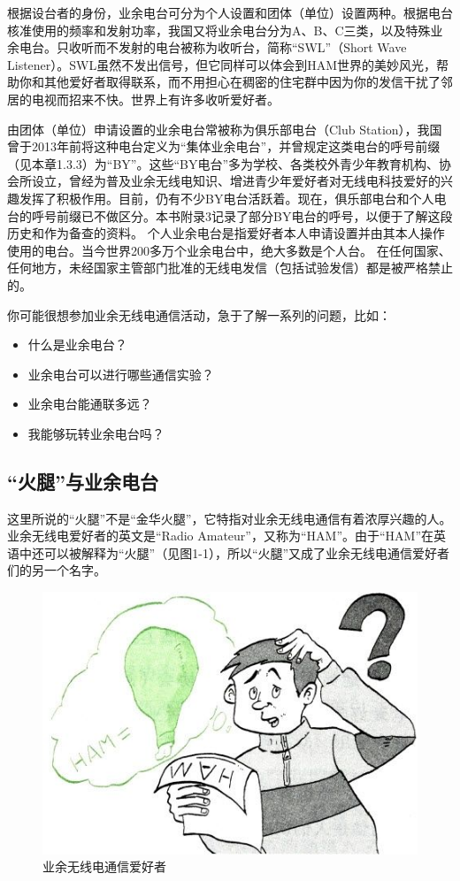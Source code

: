 \documentclass[12pt,UTF8]{ctexbook}
\begin{document}
根据设台者的身份，业余电台可分为个人设置和团体（单位）设置两种。根据电台核准使用的频率和发射功率，我国又将业余电台分为A、B、C三类，以及特殊业余电台。只收听而不发射的电台被称为收听台，简称“SWL”（Short Wave Listener）。SWL虽然不发出信号，但它同样可以体会到HAM世界的美妙风光，帮助你和其他爱好者取得联系，而不用担心在稠密的住宅群中因为你的发信干扰了邻居的电视而招来不快。世界上有许多收听爱好者。

由团体（单位）申请设置的业余电台常被称为俱乐部电台（Club Station），我国曾于2013年前将这种电台定义为“集体业余电台”，并曾规定这类电台的呼号前缀（见本章1.3.3）为“BY”。这些“BY电台”多为学校、各类校外青少年教育机构、协会所设立，曾经为普及业余无线电知识、增进青少年爱好者对无线电科技爱好的兴趣发挥了积极作用。目前，仍有不少BY电台活跃着。现在，俱乐部电台和个人电台的呼号前缀已不做区分。本书附录3记录了部分BY电台的呼号，以便于了解这段历史和作为备查的资料。
个人业余电台是指爱好者本人申请设置并由其本人操作使用的电台。当今世界200多万个业余电台中，绝大多数是个人台。
在任何国家、任何地方，未经国家主管部门批准的无线电发信（包括试验发信）都是被严格禁止的。

你可能很想参加业余无线电通信活动，急于了解一系列的问题，比如：

\begin{itemize}
	\item 什么是业余电台？
	\item 业余电台可以进行哪些通信实验？
	\item 业余电台能通联多远？
	\item 我能够玩转业余电台吗？
\end{itemize}  

\subsection{“火腿”与业余电台}

这里所说的“火腿”不是“金华火腿”，它特指对业余无线电通信有着浓厚兴趣的人。业余无线电爱好者的英文是“Radio Amateur”，又称为“HAM”。由于“HAM”在英语中还可以被解释为“火腿”（见图1-1），所以“火腿”又成了业余无线电通信爱好者们的另一个名字。

\begin{figure}[htbp]
	\centering
	\includegraphics[width=0.7\linewidth]{1}
	\caption{业余无线电通信爱好者}
	\label{fig:1}
\end{figure}
\end{document}

